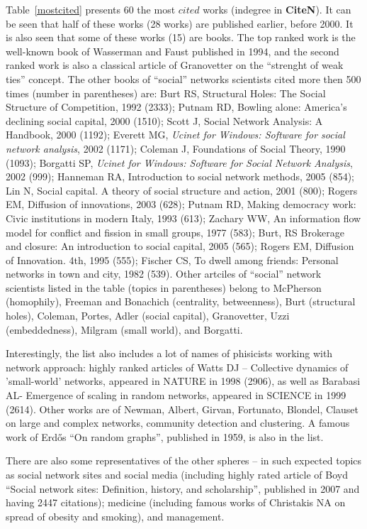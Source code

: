 \documentclass[11pt]{article} %
\begin{document}
Table~\ref{mostcited} presents 60 the most $cited$ works (indegree in \textbf{CiteN}). It can be seen that half of these works (28 works) are published earlier, before 2000. It is also seen that some of these works (15) are books. The top ranked work is the well-known book of Wasserman and Faust published in 1994, and the second ranked work is also a classical article of Granovetter on the ``strenght of weak ties'' concept. The other books of  ``social'' networks scientists cited more then 500 times (number in parentheses) are:  Burt RS, Structural Holes: The Social Structure of Competition, 1992 (2333); Putnam RD, Bowling alone: America’s declining social capital, 2000 (1510); Scott J, Social Network Analysis: A Handbook, 2000 (1192); Everett MG, \textit{Ucinet for Windows: Software for social network analysis}, 2002 (1171); Coleman J, Foundations of Social Theory, 1990 (1093); Borgatti SP,  \textit{Ucinet for Windows: Software for Social Network Analysis}, 2002 (999); Hanneman RA, Introduction to social network methods, 2005 (854); Lin N, Social capital. A theory of social structure and action, 2001 (800); Rogers EM, Diffusion of innovations, 2003 (628); Putnam RD, Making democracy work: Civic institutions in modern Italy, 1993 (613); Zachary WW, An information flow model for conflict and fission in small groups, 1977 (583); Burt, RS	Brokerage and closure: An introduction to social capital, 2005 (565);  Rogers EM, Diffusion of Innovation. 4th, 1995 (555);  Fischer CS, To dwell among friends: Personal networks in town and city, 1982 (539). Other artciles of ``social'' network scientists listed in the table (topics in parentheses) belong to McPherson (homophily), Freeman and Bonachich (centrality, betweenness), Burt (structural holes), Coleman, Portes, Adler (social capital), Granovetter, Uzzi (embeddedness), Milgram (small world), and Borgatti. \medskip 

Interestingly, the list also includes a lot of names of phisicists working with network approach: highly ranked articles of Watts DJ -- Collective dynamics of 'small-world' networks, appeared in NATURE in 1998 (2906), as well as Barabasi AL-  Emergence of scaling in random networks, appeared in SCIENCE	in 1999 (2614). Other works are of Newman, Albert, Girvan, Fortunato, Blondel, Clauset on large and complex networks, community detection and clustering. A famous work of Erd\H{o}s ``On random graphs'', published in 1959, is also in the list. \medskip 

There are also some representatives of the other spheres -- in such expected  topics as social network sites and social media (including highly rated article of Boyd ``Social network sites: Definition, history, and scholarship'', published in 2007 and having 2447 citations); medicine (including famous works of Christakis NA on spread of obesity and smoking), and management. \medskip 
\end{document}
